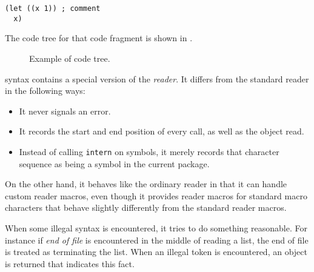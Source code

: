 \begin{verbatim}
(let ((x 1)) ; comment
  x)
\end{verbatim}

The code tree for that code fragment is shown in .

\begin{figure}
\begin{center}
\end{center}
\caption{\label{fig-code-tree}
Example of code tree.}
\end{figure}

\commonlisp{} syntax contains a special version of the \commonlisp{}
\emph{reader}.  It differs from the standard reader in the following
ways:

\begin{itemize}
\item It never signals an error.
\item It records the start and end position of every call, as well as
  the object read.
\item Instead of calling \texttt{intern} on symbols, it merely records
  that character sequence as being a symbol in the current package. 
\end{itemize}

On the other hand, it behaves like the ordinary \commonlisp{} reader
in that it can handle custom reader macros, even though it provides
reader macros for standard macro characters that behave slightly
differently from the standard reader macros.

When some illegal syntax is encountered, it tries to do something
reasonable.  For instance if \emph{end of file} is encountered in the
middle of reading a list, the end of file is treated as terminating
the list.  When an illegal token is encountered, an object is returned
that indicates this fact. 


